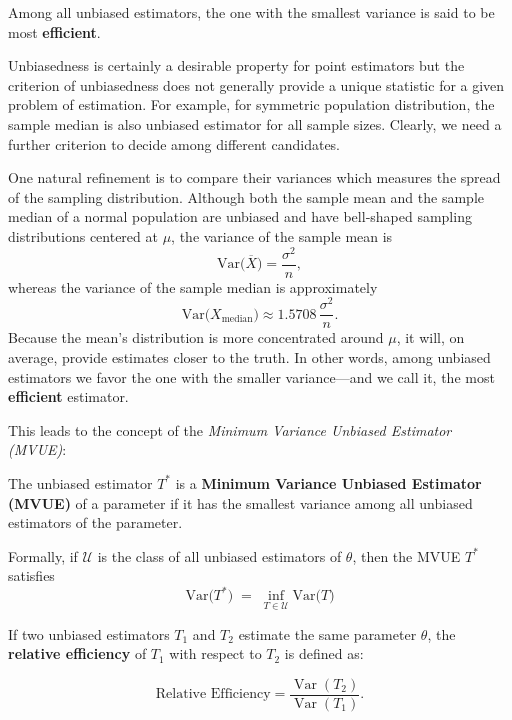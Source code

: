 \documentclass[twoside]{book}
\begin{document}
\begin{enumerate}
    \begin{textbox}
    Among all unbiased estimators, the one with the smallest variance is said to be most \textbf{efficient}.
    \end{textbox}

    Unbiasedness is certainly a desirable property for point estimators but the criterion of unbiasedness does not generally provide a unique statistic for a given problem of estimation. For example, for symmetric population distribution, the sample median is also unbiased estimator for all sample sizes. Clearly, we need a further criterion to decide among different candidates.

    One natural refinement is to compare their variances which measures the spread
     of the sampling distribution. Although both the sample mean and the sample median of a normal population are unbiased and have bell‐shaped sampling distributions centered at \(\mu\), the variance of the sample mean is
        \[
        \mathrm{Var}\bigl(\overline{X}\bigr) = \frac{\sigma^2}{n},
        \]
        whereas the variance of the sample median is approximately
        \[
        \mathrm{Var}\bigl(X_{\text{median}}\bigr) \approx 1.5708\,\frac{\sigma^2}{n}.
        \]
        Because the mean’s distribution is more concentrated around \(\mu\), it will, on average, provide estimates closer to the truth. In other words, among unbiased estimators we favor the one with the smaller variance—and we call it, the most \textbf{efficient} estimator.

        This leads to the concept of the \emph{Minimum Variance Unbiased Estimator (MVUE)}:

        \begin{textbox}
        The unbiased estimator $T^*$ is a \textbf{Minimum Variance Unbiased Estimator (MVUE)} of a parameter if it has the smallest variance among all unbiased estimators of the parameter.

        Formally, if \(\mathcal{U}\) is the class of all unbiased estimators of \(\theta\), then the MVUE \(T^*\) satisfies
                \[
                \mathrm{Var}\bigl(T^*\bigr) \;=\; \inf_{T \in \mathcal{U}} \mathrm{Var}\bigl(T\bigr)
                \]
            \end{textbox}

        If two unbiased estimators $T_1$ and $T_2$ estimate the same parameter $\theta$, the \textbf{relative efficiency} of $T_1$ with respect to $T_2$ is defined as:

        \begin{textbox}
        \[
                \text{Relative Efficiency} = \frac{\operatorname{Var}(T_2)}{\operatorname{Var}(T_1)}.
                \]
        \end{textbox}


\end{enumerate}
\end{document}
